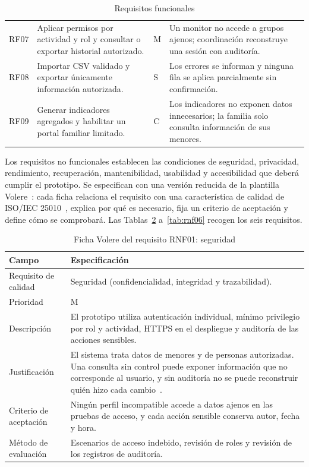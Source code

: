 \begin{table}[H]
\begin{tabularx}{\textwidth}{>{\hsize=0.275\hsize\raggedright\arraybackslash}X>{\hsize=1.591\hsize\raggedright\arraybackslash}X>{\hsize=0.436\hsize\raggedright\arraybackslash}X>{\hsize=1.698\hsize\raggedright\arraybackslash}X}
RF07 & Aplicar permisos por actividad y rol y consultar o exportar historial autorizado. & M & Un monitor no accede a grupos ajenos; coordinación reconstruye una sesión con auditoría. \\
RF08 & Importar CSV validado y exportar únicamente información autorizada. & S & Los errores se informan y ninguna fila se aplica parcialmente sin confirmación. \\
RF09 & Generar indicadores agregados y habilitar un portal familiar limitado. & C & Los indicadores no exponen datos innecesarios; la familia solo consulta información de sus menores. \\
\bottomrule
\end{tabularx}
\caption{Requisitos funcionales}\label{tab:4}
\end{table}

Los requisitos no funcionales establecen las condiciones de seguridad, privacidad, rendimiento, recuperación, mantenibilidad, usabilidad y accesibilidad que deberá cumplir el prototipo. Se especifican con una versión reducida de la plantilla Volere~\cite{ref37}: cada ficha relaciona el requisito con una característica de calidad de ISO/IEC 25010~\cite{ref12}, explica por qué es necesario, fija un criterio de aceptación y define cómo se comprobará. Las Tablas~\ref{tab:rnf01} a~\ref{tab:rnf06} recogen los seis requisitos.

\begin{table}[H]
\centering\small
\begin{tabularx}{\textwidth}{>{\hsize=0.385\hsize\raggedright\arraybackslash}X>{\hsize=1.615\hsize\raggedright\arraybackslash}X}
\toprule
\rowcolor{cabeceratabla} \textbf{Campo} & \textbf{Especificación} \\
\midrule
Requisito de calidad & Seguridad (confidencialidad, integridad y trazabilidad). \\
Prioridad & M \\
Descripción & El prototipo utiliza autenticación individual, mínimo privilegio por rol y actividad, HTTPS en el despliegue y auditoría de las acciones sensibles. \\
Justificación & El sistema trata datos de menores y de personas autorizadas. Una consulta sin control puede exponer información que no corresponde al usuario, y sin auditoría no se puede reconstruir quién hizo cada cambio~\cite{ref02,ref03}. \\
Criterio de aceptación & Ningún perfil incompatible accede a datos ajenos en las pruebas de acceso, y cada acción sensible conserva autor, fecha y hora. \\
Método de evaluación & Escenarios de acceso indebido, revisión de roles y revisión de los registros de auditoría. \\
\bottomrule
\end{tabularx}
\caption{Ficha Volere del requisito RNF01: seguridad}\label{tab:rnf01}
\end{table}

